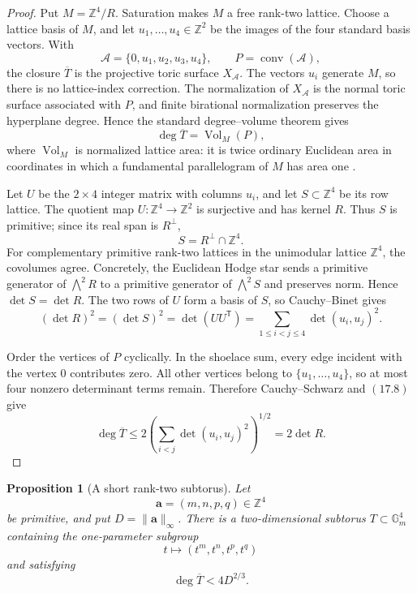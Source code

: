 \documentclass[11pt]{article}
\newtheorem{proposition}[theorem]{Proposition}
\theoremstyle{definition}
\newcommand{\Z}{\mathbb Z}
\begin{document}
\begin{proof}
Put \(M=\Z^4/R\).  Saturation makes \(M\) a free rank-two lattice.  Choose
a lattice basis of \(M\), and let \(u_1,\ldots,u_4\in\Z^2\) be the images
of the four standard basis vectors.  With
\[
 \mathcal A=\{0,u_1,u_2,u_3,u_4\},
 \qquad
 P=\operatorname{conv}(\mathcal A),
\]
the closure \(\overline T\) is the projective toric surface
\(X_{\mathcal A}\).  The vectors \(u_i\) generate \(M\), so there is no
lattice-index correction.  The normalization of \(X_{\mathcal A}\) is the
normal toric surface associated with \(P\), and finite birational
normalization preserves the hyperplane degree.  Hence the standard
degree--volume theorem gives
\[
 \deg\overline T=\operatorname{Vol}_M(P),
\]
where \(\operatorname{Vol}_M\) is normalized lattice area: it is twice
ordinary Euclidean area in coordinates in which a fundamental
parallelogram of \(M\) has area one
\cite[Theorems~3.A.5 and~13.4.3]{CoxLittleSchenck2011}.

Let \(U\) be the \(2\times4\) integer matrix with columns \(u_i\), and let
\(S\subset\Z^4\) be its row lattice.  The quotient map
\(U:\Z^4\to\Z^2\) is surjective and has kernel \(R\).  Thus \(S\) is
primitive; since its real span is \(R^\perp\),
\[
 S=R^\perp\cap\Z^4.
\]
For complementary primitive rank-two lattices in the unimodular lattice
\(\Z^4\), the covolumes agree.  Concretely, the Euclidean Hodge star sends
a primitive generator of \(\bigwedge^2R\) to a primitive generator of
\(\bigwedge^2S\) and preserves norm.  Hence \(\det S=\det R\).  The two
rows of \(U\) form a basis of \(S\), so Cauchy--Binet gives
\begin{equation}
 (\det R)^2=(\det S)^2=\det(UU^{\mathsf T})
 =\sum_{1\leq i<j\leq4}\det(u_i,u_j)^2.
 \tag{17.8}
\end{equation}

Order the vertices of \(P\) cyclically.  In the shoelace sum, every edge
incident with the vertex \(0\) contributes zero.  All other vertices belong
to \(\{u_1,\ldots,u_4\}\), so at most four nonzero determinant terms
remain.  Therefore Cauchy--Schwarz and \((17.8)\) give
\[
 \deg\overline T
 \leq2\left(\sum_{i<j}\det(u_i,u_j)^2\right)^{1/2}
 =2\det R.
\]
\end{proof}

\begin{proposition}[A short rank-two subtorus]\label{prop:shorttorus}
Let
\[
 \boldsymbol a=(m,n,p,q)\in\Z^4
\]
be primitive, and put \(D=\|\boldsymbol a\|_\infty\).  There is a
two-dimensional subtorus \(T\subset\mathbb G_m^4\) containing the
one-parameter subgroup
\[
 t\longmapsto(t^m,t^n,t^p,t^q)
\]
and satisfying
\begin{equation}
 \deg\overline T<4D^{2/3}.
 \tag{17.9}
\end{equation}
\end{proposition}
\end{document}
